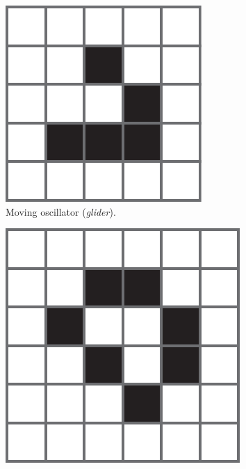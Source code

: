 \begin{figure}[htbp]
  \centering
  \begin{subfigure}[t]{.31\linewidth}
    \centering
    \includegraphics[width=\linewidth]{figures/glider.pdf}
    \caption{Moving oscillator (\emph{glider}).}
    \label{fig:glider}
  \end{subfigure}
  \begin{subfigure}[t]{.31\linewidth}
    \centering
    \includegraphics[width=\linewidth]{figures/still_life.pdf}

\end{subfigure}
\end{figure}
